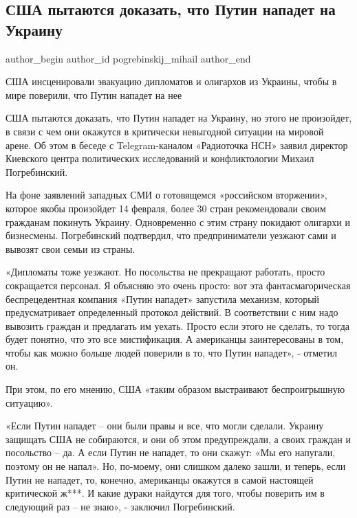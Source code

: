  
 
 
 
 
 
\subsection{США пытаются доказать, что Путин нападет на Украину}
\label{sec:15_02_2022.fb.pogrebinskij_mihail.1.usa_putin_ukraina}
 
\ifcmt
 author_begin
   author_id pogrebinskij_mihail
 author_end
\fi

США инсценировали эвакуацию дипломатов и олигархов из Украины, чтобы в мире
поверили, что Путин нападет на нее

США пытаются доказать, что Путин нападет на Украину, но этого не произойдет, в
связи с чем они окажутся в критически невыгодной ситуации на мировой арене. Об
этом в беседе с Telegram-каналом «Радиоточка НСН» заявил директор Киевского
центра политических исследований и конфликтологии Михаил Погребинский.

На фоне заявлений западных СМИ о готовящемся «российском вторжении», которое
якобы произойдет 14 февраля, более 30 стран рекомендовали своим гражданам
покинуть Украину. Одновременно с этим страну покидают олигархи и бизнесмены.
Погребинский подтвердил, что предприниматели уезжают сами и вывозят свои семьи
из страны.

«Дипломаты тоже уезжают. Но посольства не прекращают работать, просто
сокращается персонал. Я объясняю это очень просто: вот эта фантасмагорическая
беспрецедентная компания «Путин нападет» запустила механизм, который
предусматривает определенный протокол действий. В соответствии с ним надо
вывозить граждан и предлагать им уехать. Просто если этого не сделать, то тогда
будет понятно, что это все мистификация. А американцы заинтересованы в том,
чтобы как можно больше людей поверили в то, что Путин нападет», - отметил он.

При этом, по его мнению, США «таким образом выстраивают беспроигрышную
ситуацию».

«Если Путин нападет – они были правы и все, что могли сделали. Украину защищать
США не собираются, и они об этом предупреждали, а своих граждан и посольство –
да. А если Путин не нападет, то они скажут: «Мы его напугали, поэтому он не
напал». Но, по-моему, они слишком далеко зашли, и теперь, если Путин не
нападет, то, конечно, американцы окажутся в самой настоящей критической ж***. И
какие дураки найдутся для того, чтобы поверить им в следующий раз – не знаю», -
заключил Погребинский.

